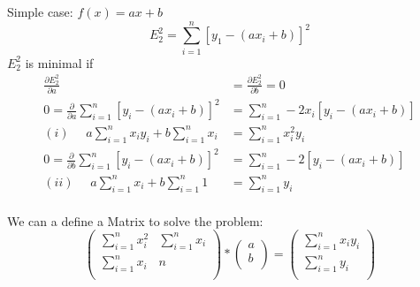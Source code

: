 \begin{example}
    Simple case: $f(x) = ax + b$
    \begin{equation*}
        E_2^2 = \sum_{i=1}^{n}[y_1 - (ax_i + b)]^2
    \end{equation*}
    $E_2^2$ is minimal if
    \begin{align*}
        \frac{\partial E_2^2}{\partial a} &= \frac{\partial E_2^2}{\partial b} = 0\\
        0 = \frac{\partial }{\partial a} \sum_{i=1}^n [y_i - (ax_i + b)]^2 &= \sum_{i=1}^n -2x_i[y_i - (ax_i + b)] \\
        (i) \phantom{=} a \sum_{i=1}^n x_i y_i + b \sum_{i=1}^n x_i &= \sum_{i=1}^n x_i^2 y_i \\
        0 = \frac{\partial }{\partial b} \sum_{i=1}^{n} [y_i - (ax_i + b)]^2 &= \sum_{i=1}^n -2[y_i - (ax_i + b)] \\
        (ii) \phantom{=} a \sum_{i=1}^n x_i + b \sum_{i=1}^n 1 &= \sum_{i=1}^n y_i \\
    \end{align*}

    We can a define a Matrix to solve the problem:
    \begin{equation*}
        \begin{pmatrix}
            \sum_{i=1}^n x_i^2 & \sum_{i=1}^n x_i \\
            \sum_{i=1}^n x_i   & n                \\
        \end{pmatrix}
        *
        \begin{pmatrix}
            a \\
            b \\
        \end{pmatrix}
        =
        \begin{pmatrix}
            \sum_{i=1}^n x_i y_i \\
            \sum_{i=1}^n y_i     \\
        \end{pmatrix}
    \end{equation*}
\end{example}



